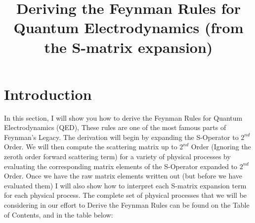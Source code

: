 \documentclass[a4]{article}
\begin{document}
    \title{Deriving the Feynman Rules for Quantum Electrodynamics (from the S-matrix expansion)}
    \maketitle

    \tableofcontents


    \section{Introduction}

        In this section, I will show you how to derive the Feynman Rules for Quantum Electrodynamics (QED),
        These rules are one of the most famous parts of Feynman's Legacy. The derivation will begin by expanding
        the S-Operator to $2^{nd}$ Order. We will then compute the scattering matrix up to $2^{nd}$ Order
        (Ignoring the zeroth order forward scattering term) for a variety of physical processes by evaluating
        the corresponding matrix elements of the S-Operator expanded to $2^{nd}$ Order. Once we have the raw
        matrix elements written out (but before we have evaluated them) I will also show how to interpret each
        S-matrix expansion term for each physical process. The complete set of physical processes that we will
        be considering in our effort to Derive the Feynman Rules can be found on the Table of Contents, and in the
        table below:

        \vspace{0.75cm}
\end{document}
